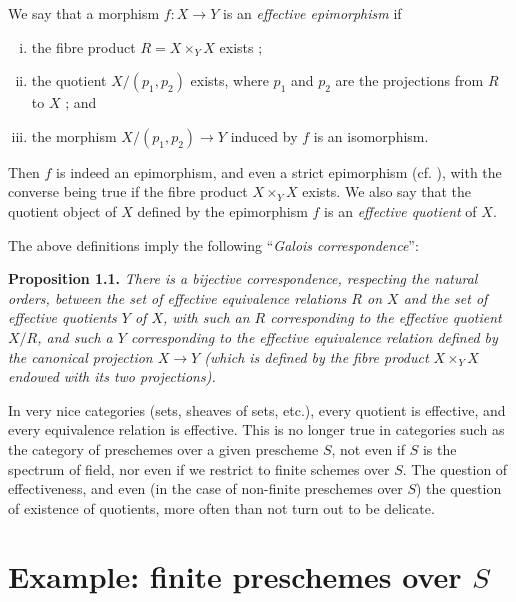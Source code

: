 \documentclass{article}
\newenvironment{itenv}[1]
  {\phantomsection\par\medskip\noindent\textbf{#1.}\itshape}
  {\medskip}
\newcommand{\oldpage}[1]{\marginpar{\footnotesize$\Big\vert$ \textit{p.~#1}}}
\begin{document}
We say that a morphism $f\colon X\to Y$ is an \emph{effective epimorphism} if
\begin{enumerate}[(i)]
  \item the fibre product $R=X\times_Y X$ exists ;
  \item the quotient $X/(p_1,p_2)$ exists, where $p_1$ and $p_2$ are the projections from $R$ to $X$ ; and
  \item the morphism $X/(p_1,p_2)\to Y$ induced by $f$ is an isomorphism.
\end{enumerate}
Then $f$ is indeed an epimorphism, and even a strict epimorphism (cf. \cite[A.2.3]{1}), with the converse being true if the fibre product $X\times_Y X$ exists.
We also say that the quotient object of $X$ defined by the epimorphism $f$ is an \emph{effective quotient} of $X$.

The above definitions imply the following ``\emph{Galois correspondence}'':

\oldpage{212-04}
\begin{itenv}{Proposition 1.1}
\label{proposition1.1}
  There is a bijective correspondence, respecting the natural orders, between the set of effective equivalence relations $R$ on $X$ and the set of effective quotients $Y$ of $X$, with such an $R$ corresponding to the effective quotient $X/R$, and such a $Y$ corresponding to the effective equivalence relation defined by the canonical projection $X\to Y$ (which is defined by the fibre product $X\times_Y X$ endowed with its two projections).
\end{itenv}

In very nice categories (sets, sheaves of sets, etc.), every quotient is effective, and every equivalence relation is effective.
This is no longer true in categories such as the category of preschemes over a given prescheme $S$, not even if $S$ is the spectrum of field, nor even if we restrict to finite schemes over $S$.
The question of effectiveness, and even (in the case of non-finite preschemes over $S$) the question of existence of quotients, more often than not turn out to be delicate.


\section{Example: finite preschemes over \texorpdfstring{$S$}{S}}
\label{2}
\end{document}
